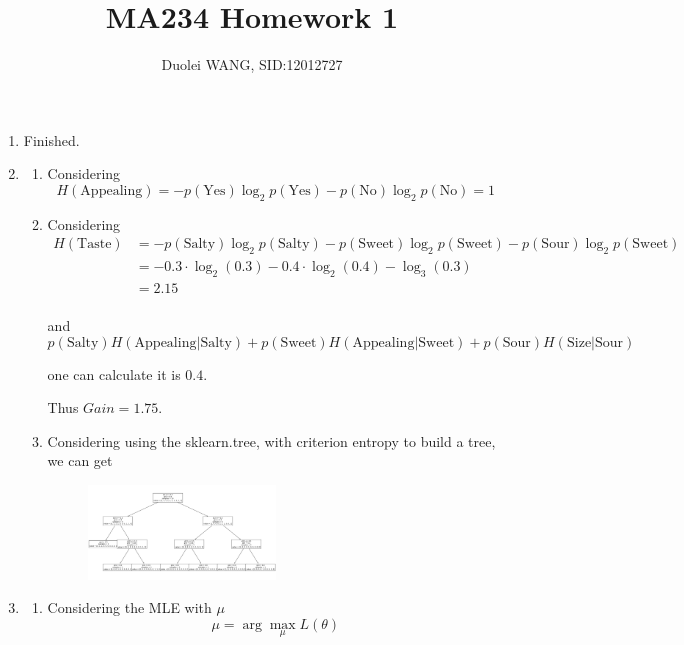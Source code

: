 \documentclass{article}
\title{MA234 Homework 1}
\author{Duolei WANG, SID:12012727}
\affil{wangdl2020@mail.sustech.edu.cn}
\date{}
\begin{document}
\maketitle
\begin{enumerate}
\item Finished.

\item 
\begin{enumerate}
\item Considering
\[H(\mathrm{Appealing}) = - p(\mathrm{Yes})\log_2 p(\mathrm{Yes}) - p(\mathrm{No})\log_2 p(\mathrm{No}) = 1\]

\item Considering
\begin{align*}
H(\mathrm{Taste}) &= -p(\mathrm{Salty})\log_2p(\mathrm{Salty}) - p(\mathrm{Sweet})\log_2 p(\mathrm{Sweet}) - p(\mathrm{Sour})\log_2 p(\mathrm{Sweet})\\
&= - 0.3 \cdot \log_2(0.3) - 0.4 \cdot \log_2(0.4) - \log_3(0.3)\\
&= 2.15\\
\end{align*}

and
\[p({\mathrm{Salty}}) H(\mathrm{Appealing |Salty}) + p({\mathrm{Sweet}})H(\mathrm{Appealing |Sweet}) +p({\mathrm{Sour}}) H({\mathrm{Size | Sour}})\]

one can calculate it is \(0.4\).

Thus \(Gain = 1.75\).

\item Considering using the sklearn.tree, with criterion entropy to build a tree, we can get

\begin{figure}[!hb]
    \centering
    \includegraphics[width = 0.5\textwidth]{output.png}
\end{figure}

\end{enumerate}

\item 
\begin{enumerate}
\item Considering the MLE with \(\mu\)
\[\mu = \arg\max_{\mu} L(\theta)\]


\end{enumerate}
\end{enumerate}
\end{document}
